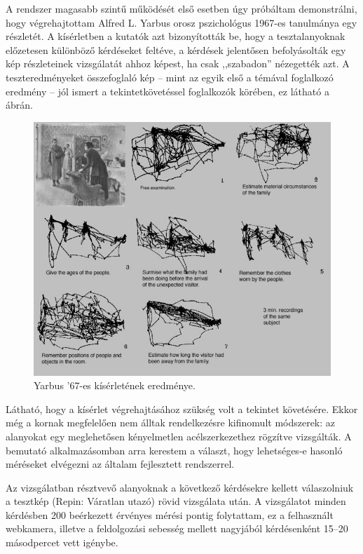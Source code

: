 A rendszer magasabb szintű működését első esetben úgy próbáltam demonstrálni, hogy végrehajtottam Alfred L. Yarbus orosz pszichológus 1967-es tanulmánya egy részletét. A kísérletben a kutatók azt bizonyították be, hogy a tesztalanyoknak előzetesen különböző kérdéseket feltéve, a kérdések jelentősen befolyásolták egy kép részleteinek vizsgálatát ahhoz képest, ha csak ,,szabadon'' nézegették azt. A teszteredményeket összefoglaló kép -- mint az egyik első a témával foglalkozó eredmény -- jól ismert a tekintetkövetéssel foglalkozók körében, ez látható a  ábrán.

\begin{figure}[!ht]
\centering
\includegraphics[width=140mm, keepaspectratio]{figures/yarbus.jpg}
\caption{Yarbus '67-es kísérletének eredménye.}
\label{fig:yarbus}
\end{figure}

Látható, hogy a kísérlet végrehajtásához szükség volt a tekintet követésére. Ekkor még a kornak megfelelően nem álltak rendelkezésre kifinomult módszerek: az alanyokat egy meglehetősen kényelmetlen acélszerkezethez rögzítve vizsgálták. A bemutató alkalmazásomban arra kerestem a választ, hogy lehetséges-e hasonló méréseket elvégezni az általam fejlesztett rendszerrel.

\bigskip

Az vizsgálatban résztvevő alanyoknak a következő kérdésekre kellett válaszolniuk a tesztkép (Repin: Váratlan utazó) rövid vizsgálata után. A vizsgálatot minden kérdésben 200 beérkezett érvényes mérési pontig folytattam, ez a felhasznált webkamera, illetve a feldolgozási sebesség mellett nagyjából kérdésenként 15--20 másodpercet vett igénybe.

